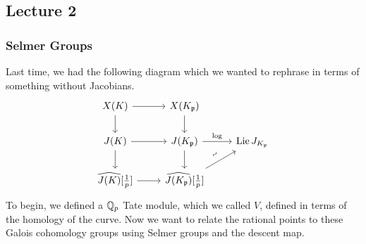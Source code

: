 \newpage
\subsection{Lecture 2}
\subsubsection{Selmer Groups}

Last time, we had the following diagram which we wanted to rephrase in terms of something without Jacobians.
	\[
	\begin{tikzcd}
	X(K) \arrow{d} \arrow{r} & X(K_\p) \arrow{d} \\
	J(K) \arrow{r} \arrow{d} & J(K_\p) \arrow{r}{\log} \arrow{d} & \lie J_{K_\p} \\
	\widehat{J(K)}[\frac{1}{p}] \arrow{r} & \widehat{J(K_\p)}[\frac{1}{p}] \arrow{ur}{\rotatebox{45}{$\sim$}} 
	\end{tikzcd}
	\]
To begin, we defined a $\mathbb{Q}_p$ Tate module, which we called $V$, defined in terms of the \etale homology of the curve. Now we want to relate the rational points to these Galois cohomology groups using Selmer groups and the descent map. 


